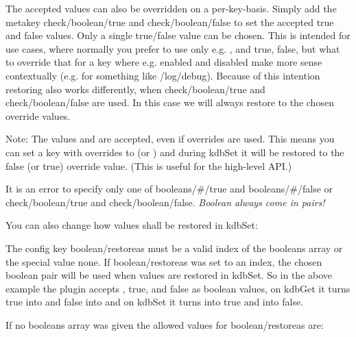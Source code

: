 The accepted values can also be overridden on a per-\/key-\/basis. Simply add the metakey {\ttfamily check/boolean/true} and {\ttfamily check/boolean/false} to set the accepted true and false values. Only a single true/false value can be chosen. This is intended for use cases, where normally you prefer to use only e.\+g. {}, {} and {\ttfamily true}, {\ttfamily false}, but what to override that for a key where e.\+g. {\ttfamily enabled} and {\ttfamily disabled} make more sense contextually (e.\+g. for something like {\ttfamily /log/debug}). Because of this intention restoring also works differently, when {\ttfamily check/boolean/true} and {\ttfamily check/boolean/false} are used. In this case we will always restore to the chosen override values.

Note\+: The values {} and {} are accepted, even if overrides are used. This means you can set a key with overrides to {} (or {}) and during {\ttfamily kdb\+Set} it will be restored to the false (or true) override value. (This is useful for the high-\/level A\+PI.)

It is an error to specify only one of {\ttfamily booleans/\#/true} and {\ttfamily booleans/\#/false} or {\ttfamily check/boolean/true} and {\ttfamily check/boolean/false}. {\itshape Boolean always come in pairs!}

You can also change how values shall be restored in {\ttfamily kdb\+Set}\+:




The config key {\ttfamily boolean/restoreas} must be a valid index of the {\ttfamily booleans} array or the special value {\ttfamily none}. If {\ttfamily boolean/restoreas} was set to an index, the chosen boolean pair will be used when values are restored in {\ttfamily kdb\+Set}. So in the above example the plugin accepts {}, {\ttfamily true}, {} and {\ttfamily false} as boolean values, on {\ttfamily kdb\+Get} it turns {\ttfamily true} into {} and {\ttfamily false} into {} and on {\ttfamily kdb\+Set} it turns {} into {\ttfamily true} and {} into {\ttfamily false}.

If no {\ttfamily booleans} array was given the allowed values for {\ttfamily boolean/restoreas} are\+:


